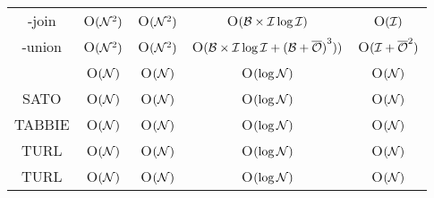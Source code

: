 \begin{table*}[t]
{\begin{tabular}{c||cc|cc}
			\infogather-join        & O$(\mathcal{N}^2)$         & O$(\mathcal{N}^2)$     & O$(\mathcal{B} \times \mathcal{I} \log \mathcal{I})$              & O$(\mathcal{I})$      \\
			\infogather-union        & O$(\mathcal{N}^2)$          & O$(\mathcal{N}^2)$    & O$(\mathcal{B} \times \mathcal{I} \log \mathcal{I} + {(\mathcal{B} + \overline{\mathcal{O}})}^3))$              & O$(\mathcal{I} + {\overline{\mathcal{O}}}^2)$      \\
			\aurum            & O$(\mathcal{N})$         & O$(\mathcal{N})$                   & O$(\log \mathcal{N})$                & O$(\mathcal{N})$ \\
			SATO            & O$(\mathcal{N})$         & O$(\mathcal{N})$                   & O$(\log \mathcal{N})$                & O$(\mathcal{N})$    \\
			TABBIE         & O$(\mathcal{N})$         & O$(\mathcal{N})$                   & O$(\log \mathcal{N})$                & O$(\mathcal{N})$    \\
			TURL         & O$(\mathcal{N})$         & O$(\mathcal{N})$                   & O$(\log \mathcal{N})$                & O$(\mathcal{N})$    \\
			TURL         & O$(\mathcal{N})$         & O$(\mathcal{N})$                   & O$(\log \mathcal{N})$                & O$(\mathcal{N})$    \\
			\bottomrule
		\end{tabular}
	}
	\vspace{-1em}
	\label{table:complex_analyse}
	\end{table*}

